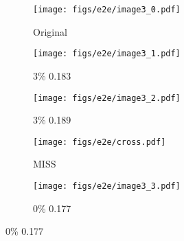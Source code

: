 \begin{figure}[t]
    \vspace{-2.7em}
    \begin{minipage}{0.06\textwidth}
        \centering
    \end{minipage}%
    \begin{subfigure}[b]{0.075\textwidth}
        \texttt{[image: figs/e2e/image3\_0.pdf]}
        \caption*{\scriptsize Original}
    \end{subfigure}
    \begin{subfigure}[b]{0.075\textwidth}
        \texttt{[image: figs/e2e/image3\_1.pdf]}
        \caption*{\scriptsize 3\% 0.183}
    \end{subfigure}
    \begin{subfigure}[b]{0.075\textwidth}
        \texttt{[image: figs/e2e/image3\_2.pdf]}
        \caption*{\scriptsize 3\% 0.189}
    \end{subfigure}
        \begin{subfigure}[b]{0.075\textwidth}
        \texttt{[image: figs/e2e/cross.pdf]}
        \caption*{\scriptsize MISS}
    \end{subfigure}
        \begin{subfigure}[b]{0.075\textwidth}
        \texttt{[image: figs/e2e/image3\_3.pdf]}
        \caption*{\scriptsize 0\% 0.177}
    \end{subfigure}


\end{figure}
